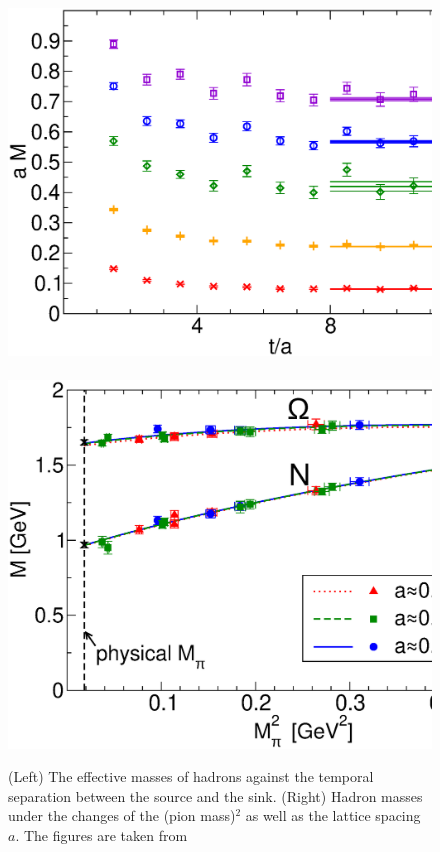 \begin{figure}[t]
\begin{center}
\includegraphics[scale=0.29]{Chapter3-figures/effective-mass.eps} \ \ 
\includegraphics[scale=0.28]{Chapter3-figures/NO_scaling.eps}
 \end{center}
\caption{(Left) The effective masses of hadrons against the 
 temporal separation between the source and the sink. 
(Right)  Hadron masses under the changes of the (pion mass)$^2$ as well as the lattice spacing $a$.
The figures are taken from \cite{Durr:2008zz}
  }
\label{fig:hadron-mass}
\end{figure}

